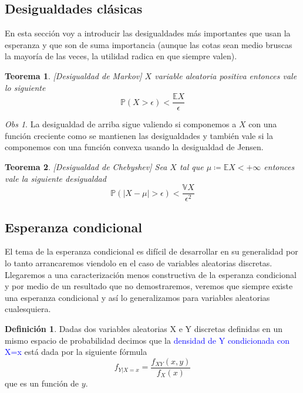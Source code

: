 \documentclass[11pt]{article}
\theoremstyle{plain} %
\newtheorem{teorema}{Teorema}
\theoremstyle{definition}
\newtheorem*{definicion}{Definici\'{o}n} %
\theoremstyle{remark}
\newtheorem{obs}{Obs}
\def\V{\mathbb{V}}
\def\E{\mathbb{E}}
\def\P{\mathbb{P}}
\def\va{variable aleatoria }
\def\vas{variables aleatorias }
\def\blue{\textcolor{blue}}
\begin{document}
\medskip



\subsection{Desigualdades clásicas}

En esta sección voy a introducir las desigualdades más importantes que usan la esperanza y que son de suma importancia (aunque las cotas sean medio bruscas la mayoría de las veces, la utilidad radica en que siempre valen).

\begin{teorema}	
	\label{teo:markov}
	[Desigualdad de Markov]
	$X$ \va positiva entonces vale lo siguiente
	\[ \P\left( X>\epsilon\right)  < \dfrac{\E X}{\epsilon} \]
\end{teorema}


\begin{obs}	
	La desigualdad de arriba sigue valiendo si componemos a $X$ con una función creciente como se mantienen las desigualdades y también vale si la componemos con una función convexa usando la desigualdad de Jensen.
\end{obs}

\begin{teorema}
	\label{teo:cheby}
	[Desigualdad de  Chebyshev]
	Sea $X$ tal que $\mu \coloneqq \E X < +\infty$ entonces vale la siguiente desigualdad
	\[ \P\left( \left| X - \mu \right| > \epsilon \right) < \dfrac{\V X}{\epsilon ^ {2}} \]
\end{teorema}




\subsection{Esperanza condicional}
El tema de la esperanza condicional es difícil de desarrollar en su generalidad por lo tanto arrancaremos viendolo en el caso de \vas discretas. Llegaremos a una caracterización menos constructiva de la esperanza condicional y por medio de un resultado que no demostraremos, veremos que siempre existe una esperanza condicional y así lo generalizamos para \vas cualesquiera.

\begin{definicion}
	Dadas dos variables aleatorias X e Y discretas definidas en un mismo espacio de probabilidad decimos que la \blue{densidad de Y condicionada con X=x} está dada por la siguiente fórmula
	\[ f_{Y|X=x} = \dfrac{f_{XY} (x,y)}{f_X(x)} \]
	que es un función de $y$.
\end{definicion}
\end{document}
